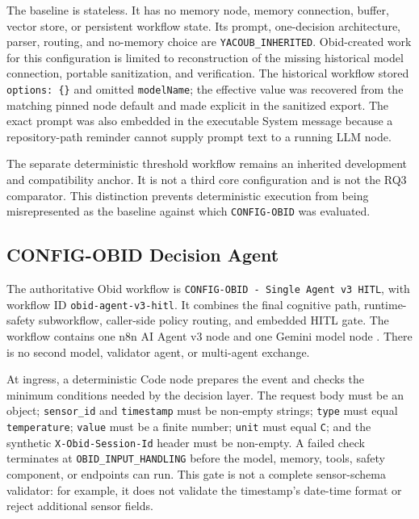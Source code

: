 The baseline is stateless. It has no memory node, memory connection, buffer,
vector store, or persistent workflow state. Its prompt, one-decision
architecture, parser, routing, and no-memory choice are
\texttt{YACOUB\_INHERITED}. Obid-created work for this configuration is
limited to reconstruction of the missing historical model connection,
portable sanitization, and verification. The historical workflow stored
\texttt{options: \{\}} and omitted \texttt{modelName}; the effective
 value was recovered from the matching pinned
node default and made explicit in the sanitized export. The exact prompt was
also embedded in the executable System message because a repository-path
reminder cannot supply prompt text to a running LLM node.

The separate deterministic threshold workflow remains an inherited
development and compatibility anchor. It is not a third core configuration
and is not the RQ3 comparator. This distinction prevents deterministic
execution from being misrepresented as the baseline against which
\texttt{CONFIG-OBID} was evaluated.

\subsection{CONFIG-OBID Decision Agent}\label{subsec:impl-agent}

The authoritative Obid workflow is
\texttt{CONFIG-OBID - Single Agent v3 HITL}, with workflow ID
\texttt{obid-agent-v3-hitl}. It combines the final cognitive path,
runtime-safety subworkflow, caller-side policy routing, and embedded HITL
gate. The workflow contains one n8n AI Agent v3 node and one Gemini model
node \cite{n8nAIAgent,n8nGeminiChatModel}. There is no second model, validator
agent, or multi-agent exchange.

At ingress, a deterministic Code node prepares the event and checks the
minimum conditions needed by the decision layer. The request body must be an
object; \texttt{sensor\_id} and \texttt{timestamp} must be non-empty strings;
\texttt{type} must equal \texttt{temperature}; \texttt{value} must be a
finite number; \texttt{unit} must equal \texttt{C}; and the synthetic
\texttt{X-Obid-Session-Id} header must be non-empty. A failed check terminates
at \texttt{OBID\_INPUT\_HANDLING} before the model, memory, tools, safety
component, or endpoints can run. This gate is not a complete sensor-schema
validator: for example, it does not validate the timestamp's date-time format
or reject additional sensor fields.

